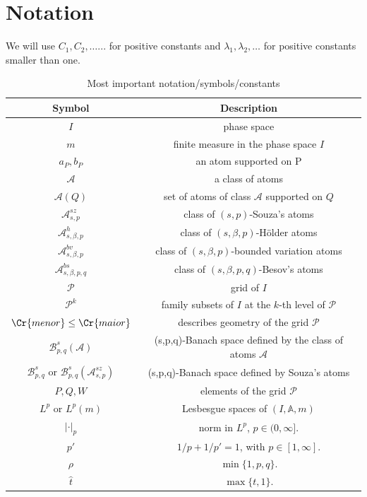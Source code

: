\documentclass{amsart}
\theoremstyle{definition}
\newcommand{\Crr}[1]{\Cr{#1}}
\begin{document}
\section{Notation} We will use $C_1, C_2, \dots...$ for positive constants and  $\lambda_1, \lambda_2, \dots$ for positive constants smaller than one.  


\begin{table}[h]
  \centering
  \caption{Most important notation/symbols/constants}
  \label{tab:table1}
  \begin{tabular}{cc}
    \toprule
    Symbol & Description\\
    \midrule
    $I$ & phase space\\
     $m$ & finite measure in  the phase space $I$\\
     $a_P, b_P$ & an atom supported on P\\
     $\mathcal{A}$ & a class of atoms \\
     $\mathcal{A}(Q)$ & set of atoms of class $\mathcal{A}$ supported on $Q$ \\
     $\mathcal{A}^{sz}_{s,p}$& class of $(s,p)$-Souza's atoms \\
     $\mathcal{A}^{h}_{s,\beta,p}$& class of $(s,\beta,p)$-H\"older atoms \\
     $\mathcal{A}^{bv}_{s, \beta,p}$& class of $(s,\beta,p)$-bounded variation atoms \\
     $\mathcal{A}^{bs}_{s,\beta,p,q} $ & class of $(s,\beta,p,q)$-Besov's atoms \\
     $\mathcal{P}$ & grid of  $I$\\
    $\mathcal{P}^k$ & family  subsets of $I$ at the $k$-th level of $\mathcal{P}$\\
    $\Crr{menor} \leq \Crr{maior}$ & describes geometry of the grid $\mathcal{P}$\\
    $\mathcal{B}^s_{p,q}(\mathcal{A})$ & (s,p,q)-Banach space defined by the class of atoms $\mathcal{A}$\\
    $\mathcal{B}^s_{p,q}$ or  $\mathcal{B}^s_{p,q}(\mathcal{A}^{sz}_{s,p})$ & (s,p,q)-Banach space defined by Souza's atoms\\
    $P, Q, W$ & elements of the grid $\mathcal{P}$\\
    $L^p$ or $L^p(m)$ & Lesbesgue spaces of  $(I,\mathbb{A}, m)$ \\
    $|\cdot|_p$ & norm in $L^p$, $p \in (0,\infty].$ \\
    $p'$ & $1/p+ 1/p'=1$, with $p\in [1,\infty]$.  \\
    $\rho$ & $\min\{1,p,q\}$.\\
    $\hat{t}$  & $\max\{t,1\}.$\\
    \bottomrule
  \end{tabular}
\end{table}
\end{document}
